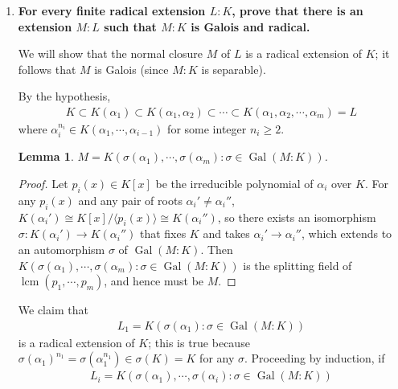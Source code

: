 \documentclass[12pt]{article}
\newtheorem{lemma}{Lemma}
\DeclareMathOperator{\Gal}{Gal}
\DeclareMathOperator{\lcm}{lcm}
\begin{document}
\begin{enumerate}
\begin{enumerate}
            \item
                \boldmath\textbf{For every finite radical extension $L:K$, prove that there is an extension $M:L$ such that $M:K$ is Galois and radical.
                }\unboldmath \par
                We will show that the normal closure $M$ of $L$ is a radical extension of $K$; it follows that $M$ is Galois (since $M:K$ is separable). \par
                By the hypothesis,
                \begin{align*}
                    K \subset K(\alpha_1) \subset K(\alpha_1, \alpha_2) \subset \cdots \subset K(\alpha_1, \alpha_2, \cdots, \alpha_m) = L
                \end{align*}
                where $\alpha_i^{n_i} \in K(\alpha_1, \cdots, \alpha_{i - 1})$ for some integer $n_i \geq 2$. 
                \begin{lemma}
                    $M = K(\sigma(\alpha_1), \cdots, \sigma(\alpha_m) : \sigma \in \Gal(M : K))$.
                \end{lemma}
                \begin{proof}
                    Let $p_i(x) \in K[x]$ be the irreducible polynomial of $\alpha_i$ over $K$. For any $p_i(x)$ and any pair of roots $\alpha_i' \neq \alpha_i''$, $K(\alpha_i') \cong K[x]/\langle p_i(x) \rangle \cong K(\alpha_i'')$, so there exists an isomorphism $\sigma : K(\alpha_i') \to K(\alpha_i'')$ that fixes $K$ and takes $\alpha_i' \to \alpha_i''$, which extends to an automorphism $\sigma$ of $\Gal(M : K)$. Then $K(\sigma(\alpha_1), \cdots, \sigma(\alpha_m) : \sigma \in \Gal(M : K))$ is the splitting field of $\lcm(p_1, \cdots, p_m)$, and hence must be $M$.
                \end{proof}
                We claim that
                \begin{align*}
                    L_1 = K(\sigma(\alpha_1) : \sigma \in \Gal(M : K))
                \end{align*}
                \sloppy
                is a radical extension of $K$; this is true because $\sigma(\alpha_1)^{n_1} = \sigma(\alpha_1^{n_1}) \in \sigma(K) = K$ for any $\sigma$. Proceeding by induction, if
                \begin{align*}
                    L_i = K(\sigma(\alpha_1), \cdots, \sigma(\alpha_i) : \sigma \in \Gal(M : K))

\end{align*}
\end{enumerate}
\end{enumerate}
\end{document}
